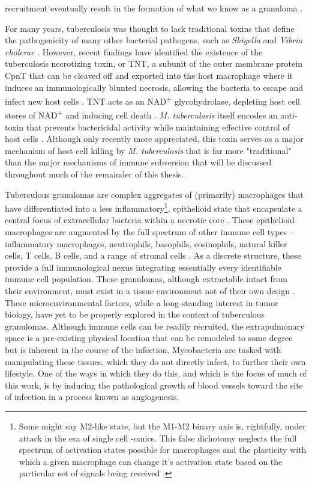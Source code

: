 recruitment eventually result in the formation of what we know as a granuloma \citep{Ramakrishnan2012, Pagan2018}. 

For many years, tuberculosis was thought to lack traditional toxins that define the pathogenicity of many other bacterial pathogens, such as \textit{Shigella} and \textit{Vibrio cholerae} \citep{Gyles2007, Tesh1991, Holmgren1981}. However, recent findings have identified the existence of the tuberculosis necrotizing toxin, or TNT, a subunit of the outer membrane protein CpnT that can be cleaved off and exported into the host macrophage where it induces an immunologically blunted necrosis, allowing the bacteria to escape and infect new host cells \citep{Danilchanka2014, Pajuelo2021, Tak2021, IzquierdoLafuente2021}. TNT acts as an NAD\textsuperscript{+} glycohydrolase, depleting host cell stores of NAD\textsuperscript{+} and inducing cell death \citep{Sun2015, Tak2019, Pajuelo2020}. \textit{M. tuberculosis} itself encodes an anti-toxin that prevents bactericidal activity while maintaining effective control of host cells \citep{Sun2015}. Although only recently more appreciated, this toxin serves as a major mechanism of host cell killing by \textit{M. tuberculosis} that is far more "traditional" than the major mechanisms of immune subversion that will be discussed throughout much of the remainder of this thesis.

Tuberculous granulomas are complex aggregates of (primarily) macrophages that have differentiated into a less inflammatory\footnote{Some might say M2-like state, but the M1-M2 binary axis is, rightfully, under attack in the era of single cell -omics. This false dichotomy neglects the full spectrum of activation states possible for macrophages and the plasticity with which a given macrophage can change it's activation state based on the particular set of signals being received \citep{Martinez2014, Ley2017}.}, epithelioid state that encapsulate a central focus of extracellular bacteria within a necrotic core \citep{Rubin2009, Cronan2016}. These epithelioid macrophages are augmented by the full spectrum of other immune cell types -- inflammatory macrophages, neutrophils, basophils, eosinophils, natural killer cells, T cells, B cells, and a range of stromal cells \citep{Russell2007, Ramakrishnan2012}. As a discrete structure, these provide a full immunological nexus integrating essentially every identifiable immune cell population. These granulomas, although extractable intact from their environment, must exist in a tissue environment not of their own design \citep{Datta2015, Kaplan2003, McCaffrey2022, Cronan2018}. These microenvironmental factors, while a long-standing interest in tumor biology, have yet to be properly explored in the context of tuberculous granulomas. Although immune cells can be readily recruited, the extrapulmonary space is a pre-existing physical location that can be remodeled to some degree but is inherent in the course of the infection. Mycobacteria are tasked with manipulating these tissues, which they do not directly infect, to further their own lifestyle. One of the ways in which they do this, and which is the focus of much of this work, is by inducing the pathological growth of blood vessels toward the site of infection in a process known as angiogenesis.

